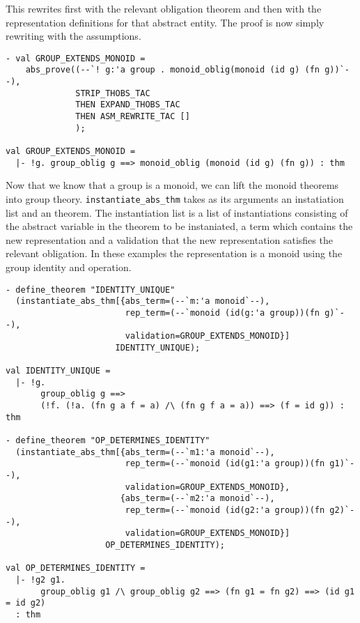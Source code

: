 This rewrites first with the relevant obligation theorem and then with the
representation definitions for that abstract entity. The proof is now
simply rewriting with the assumptions.

\begin{small}
\begin{verbatim}
- val GROUP_EXTENDS_MONOID = 
    abs_prove((--`! g:'a group . monoid_oblig(monoid (id g) (fn g))`--),
              STRIP_THOBS_TAC
              THEN EXPAND_THOBS_TAC
              THEN ASM_REWRITE_TAC []
              );

val GROUP_EXTENDS_MONOID =
  |- !g. group_oblig g ==> monoid_oblig (monoid (id g) (fn g)) : thm
\end{verbatim}
\end{small}

Now that we know that a group is a monoid, we can lift the monoid
theorems into group theory. \verb!instantiate_abs_thm! takes as its
arguments an instatiation list and an theorem. The instantiation list is a
list of instantiations consisting of the abstract variable in the
theorem to be instaniated, a term which contains the new representation
and a validation that the new representation satisfies the relevant
obligation. In these examples the representation is a monoid using the
group identity and operation.

\begin{small}
\begin{verbatim}
- define_theorem "IDENTITY_UNIQUE"
  (instantiate_abs_thm[{abs_term=(--`m:'a monoid`--),
                        rep_term=(--`monoid (id(g:'a group))(fn g)`--),
                        validation=GROUP_EXTENDS_MONOID}]
                      IDENTITY_UNIQUE);

val IDENTITY_UNIQUE =
  |- !g.
       group_oblig g ==>
       (!f. (!a. (fn g a f = a) /\ (fn g f a = a)) ==> (f = id g)) : thm

- define_theorem "OP_DETERMINES_IDENTITY"
  (instantiate_abs_thm[{abs_term=(--`m1:'a monoid`--),
                        rep_term=(--`monoid (id(g1:'a group))(fn g1)`--),
                        validation=GROUP_EXTENDS_MONOID},
                       {abs_term=(--`m2:'a monoid`--),
                        rep_term=(--`monoid (id(g2:'a group))(fn g2)`--),
                        validation=GROUP_EXTENDS_MONOID}]
                    OP_DETERMINES_IDENTITY);
  
val OP_DETERMINES_IDENTITY =
  |- !g2 g1.
       group_oblig g1 /\ group_oblig g2 ==> (fn g1 = fn g2) ==> (id g1 = id g2)
  : thm
\end{verbatim}
\end{small}

